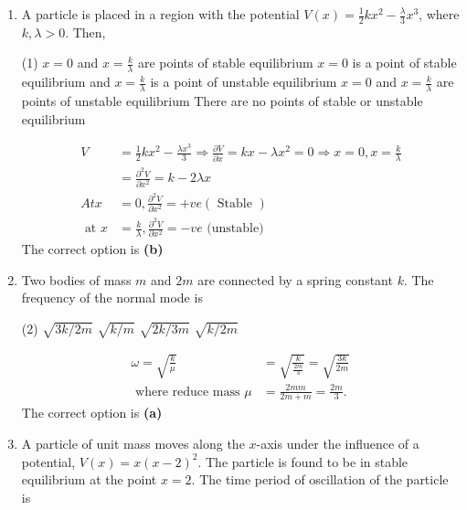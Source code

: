 \begin{enumerate}
  \item A particle is placed in a region with the potential $V(x)=\frac{1}{2} k x^{2}-\frac{\lambda}{3} x^{3}$, where $k, \lambda>0$.
  Then,
	{}
\begin{tasks}(1)
	\task[\textbf{A.}] $x=0$ and $x=\frac{k}{\lambda}$ are points of stable equilibrium
	\task[\textbf{B.}]$x=0$ is a point of stable equilibrium and $x=\frac{k}{\lambda}$ is a point of unstable equilibrium
	\task[\textbf{C.}]$x=0$ and $x=\frac{k}{\lambda}$ are points of unstable equilibrium
	\task[\textbf{D.}]There are no points of stable or unstable equilibrium
\end{tasks}
\begin{answer}
\begin{align*}
V&=\frac{1}{2} k x^{2}-\frac{\lambda x^{3}}{3} \Rightarrow \frac{\partial V}{\partial x}=k x-\lambda x^{2}=0 \Rightarrow x=0, x=\frac{k}{\lambda}\\
&=\frac{\partial^{2} V}{\partial x^{2}}=k-2 \lambda x\\
A t x&=0, \frac{\partial^{2} V}{\partial x^{2}}=+v e(\text { Stable })\\
\text { at } x&=\frac{k}{\lambda}, \frac{\partial^{2} V}{\partial x^{2}}=-v e \text { (unstable) }
\end{align*}
The correct option is \textbf{(b)}	
\end{answer}
	\item Two bodies of mass $m$ and $2 m$ are connected by a spring constant $k$. The frequency of the normal mode is
	{}
\begin{tasks}(2)
	\task[\textbf{A.}] $\sqrt{3 k / 2 m}$
	\task[\textbf{B.}]$\sqrt{k / m}$
	\task[\textbf{C.}] $\sqrt{2 k / 3 m}$
	\task[\textbf{D.}]$\sqrt{k / 2 m}$
\end{tasks}
\begin{answer}
	\begin{align*}
\omega=\sqrt{\frac{k}{\mu}}&=\sqrt{\frac{k}{\frac{2 m}{3}}}=\sqrt{\frac{3 k}{2 m}}\\
\text { where reduce mass } \mu&=\frac{2 m m}{2 m+m}=\frac{2 m}{3} \text {. }
	\end{align*}
The correct option is \textbf{(a)}
\end{answer}
	\item A particle of unit mass moves along the $x$-axis under the influence of a potential, $V(x)=x(x-2)^{2}$. The particle is found to be in stable equilibrium at the point $x=2$. The time period of oscillation of the particle is

\end{enumerate}
